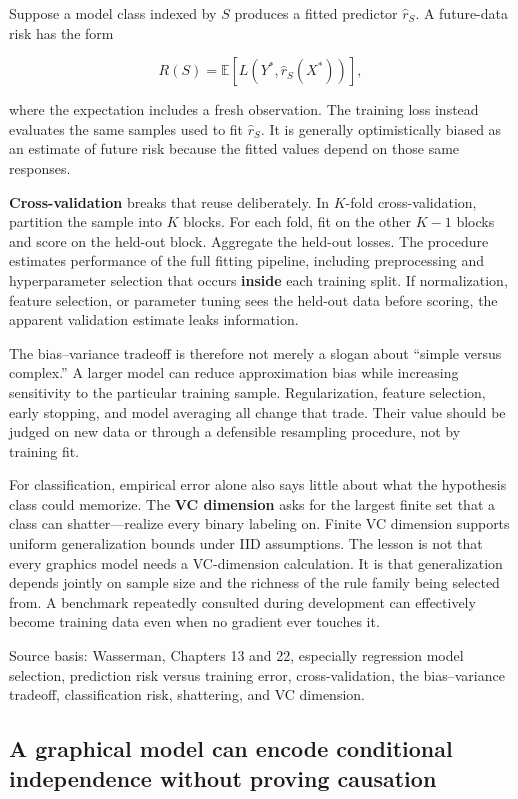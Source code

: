 Suppose a model class indexed by \(S\) produces a fitted predictor \(\hat r_S\). A future-data risk has the form

\[
R(S)
=
\mathbb E[
L(Y^*,\hat r_S(X^*))
],
\]

where the expectation includes a fresh observation. The training loss instead evaluates the same samples used to fit \(\hat r_S\). It is generally optimistically biased as an estimate of future risk because the fitted values depend on those same responses.

\textbf{Cross-validation} breaks that reuse deliberately. In \(K\)-fold cross-validation, partition the sample into \(K\) blocks. For each fold, fit on the other \(K-1\) blocks and score on the held-out block. Aggregate the held-out losses. The procedure estimates performance of the full fitting pipeline, including preprocessing and hyperparameter selection that occurs \textbf{inside} each training split. If normalization, feature selection, or parameter tuning sees the held-out data before scoring, the apparent validation estimate leaks information.

The bias--variance tradeoff is therefore not merely a slogan about ``simple versus complex.'' A larger model can reduce approximation bias while increasing sensitivity to the particular training sample. Regularization, feature selection, early stopping, and model averaging all change that trade. Their value should be judged on new data or through a defensible resampling procedure, not by training fit.

For classification, empirical error alone also says little about what the hypothesis class could memorize. The \textbf{VC dimension} asks for the largest finite set that a class can shatter---realize every binary labeling on. Finite VC dimension supports uniform generalization bounds under IID assumptions. The lesson is not that every graphics model needs a VC-dimension calculation. It is that generalization depends jointly on sample size and the richness of the rule family being selected from. A benchmark repeatedly consulted during development can effectively become training data even when no gradient ever touches it.

Source basis: Wasserman, Chapters 13 and 22, especially regression model selection, prediction risk versus training error, cross-validation, the bias--variance tradeoff, classification risk, shattering, and VC dimension.

\subsection{A graphical model can encode conditional independence without proving causation}\label{02-foundations-ii-ch030-a-graphical-model-can-encode-conditional-independence-without-proving-causation}

